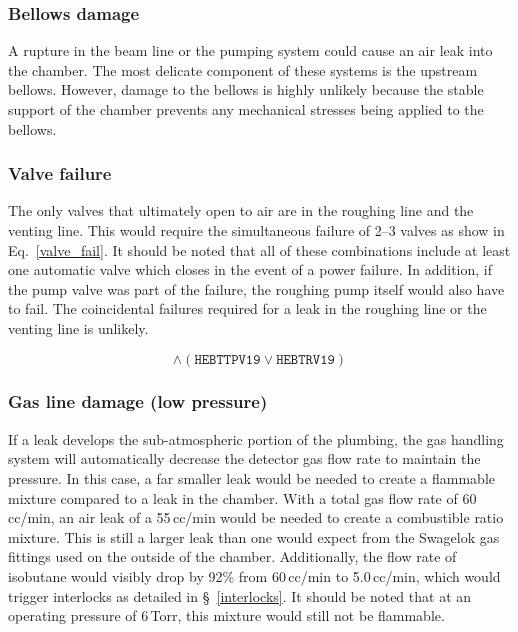 \subsubsection{Bellows damage }
A rupture in the beam line or the pumping system could cause an air leak into the chamber.  The most delicate component of these systems is the upstream bellows.  However, damage to the bellows is highly unlikely because the stable support of the chamber prevents any
mechanical stresses being applied to the bellows.

\subsubsection{Valve failure }
The only valves that ultimately open to air are in the roughing line and the venting line.  This would
require the simultaneous failure of 2--3 valves as show in Eq.~\ref{valve_fail}.  It should be noted that all of these combinations include at least one automatic valve which closes in the event of a power failure. %
In addition, if the pump valve was part of the failure, the roughing pump itself would also have to fail.  The coincidental failures required for a leak in the roughing line or the venting line is unlikely.

\begin{equation}
[\texttt{HEBTBV19} \lor (\texttt{HEBTRV19} \land \texttt{HEBTVV19A})] \land  (\texttt{HEBTTPV19} \lor \texttt{HEBTRV19})
\label{valve_fail}
\end{equation}

\subsubsection{Gas line damage (low pressure)}
If a leak develops the sub-atmospheric portion of the plumbing, the gas handling system will automatically decrease the detector gas flow rate to maintain the pressure. In this case, a far smaller leak would be needed to create a flammable mixture compared to a leak in the chamber.  With a total gas flow rate of 60\,cc/min,
an air leak of a 55\,cc/min
would be needed to create a combustible ratio mixture.  This is still a larger leak than one would expect from the Swagelok gas fittings used on the outside
of the chamber. Additionally, the flow rate of isobutane would visibly drop by 92\% from %
60\,cc/min to 5.0\,cc/min,
which would trigger interlocks as detailed in \S~\ref{interlocks}.  It should be noted that at an operating pressure of 6\,Torr, this mixture would still not be flammable.

